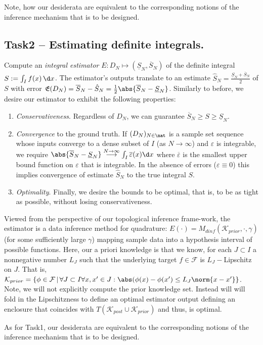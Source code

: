 Note, how our desiderata are equivalent to the corresponding notions of the inference mechanism that is to be designed.

\subsection{Task2 -- Estimating definite integrals.}
	\label{sec:problemdef_task2}
 Compute an \textit{integral estimator} $E: D_N \mapsto (\underline S_N, \overline S_N)$ of the definite integral $S := \int_I f(x) \, \d x$. The estimator's outputs translate to an estimate $\hat S_N = \frac{\underline S_N+ \overline S_N}{2}$ of $S$ with error $\mathfrak E(D_N) =\overline S_N - \hat S_N = \frac{1}{2} \abs{\overline S_N - \underline S_N}$. Similarly to before, we desire our estimator to exhibit the following properties:
\begin{enumerate}
			\item \textit{Conservativeness}.  Regardless of $D_N$, we can guarantee $\overline S_N \geq S \geq \underline S_N$. 
			
			\item \textit{Convergence} to the ground truth. If $(D_N)_{N \in \nat }$ is a sample set sequence whose inputs converge to a dense subset of $I$ (as $N \to \infty$) and $\varepsilon$ is integrable, we require $\abs{\overline S_N - \underline S_N} \stackrel{N \to \infty} \longrightarrow \int_I  \overline \varepsilon(x) \d x$ where $\overline \varepsilon$ is the smallest upper bound function on $\varepsilon$ that is integrable. In the absence of errors ($\varepsilon \equiv 0$) this implies convergence of estimate $\hat S_N$ to the true integral $S$.
			\item \textit{Optimality}. Finally, we desire the bounds to be optimal, that is, to be as tight as possible, without losing conservativeness.
\end{enumerate}

Viewed from the perspective of our topological inference frame-work, the estimator is a data inference method for quadrature:
$E(\cdot) = M_{dinf}(\mathcal K_{prior}, \cdot, \gamma ) $ (for some sufficiently large $\gamma$) mapping sample data into a hypothesis interval of possible functions. 
Here,  our a priori knowledge is that we know, for each $J \subset I$ a nonnegative number $L_J$ such that the underlying target $f \in \mathcal F$ is $L_J-$Lipschitz on $J$. That is, $\mathcal K_{prior} =\{\phi \in \mathcal F \,|\, \forall J \subset I \forall x,x' \in J: \abs(\phi(x) - \phi(x') \leq L_J \norm{x-x'}\}$. 
Note, we will not explicitly compute the prior knowledge set. Instead will will fold in the Lipschitzness to define an optimal estimator output defining an enclosure that coincides with $ T (\mathcal K_{post} \cup \mathcal K_{prior})$ and thus, is optimal.

As for Task1, our desiderata are equivalent to the corresponding notions of the inference mechanism that is to be designed.


